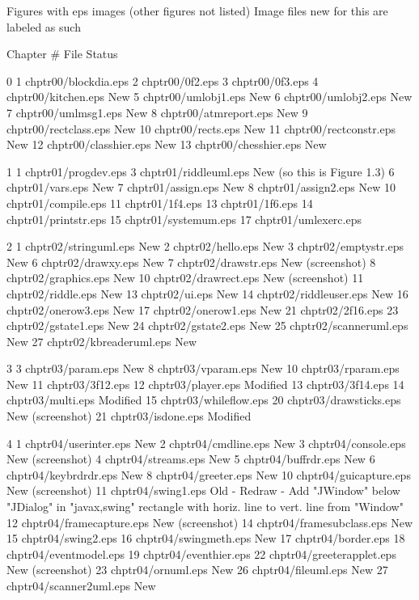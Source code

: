 Figures with eps images (other figures not listed)
Image files new for this are labeled as such

Chapter	#	File				Status

0       1       chptr00/blockdia.eps	       
	2	chptr00/0f2.eps			
	3	chptr00/0f3.eps			
	4	chptr00/kitchen.eps 	New
	5	chptr00/umlobj1.eps	 	New
	6	chptr00/umlobj2.eps		New
	7	chptr00/umlmsg1.eps		New
	8	chptr00/atmreport.eps	New
	9	chptr00/rectclass.eps	New
	10	chptr00/rects.eps		New
	11	chptr00/rectconstr.eps	New
	12	chptr00/classhier.eps	New
	13	chptr00/chesshier.eps	New

1	1	chptr01/progdev.eps		
	3	chptr01/riddleuml.eps	New    (so this is Figure 1.3)
	6	chptr01/vars.eps		New
	7	chptr01/assign.eps		New
	8	chptr01/assign2.eps		New
	10	chptr01/compile.eps
	11	chptr01/1f4.eps
	13	chptr01/1f6.eps
	14	chptr01/printstr.eps
	15	chptr01/systemum.eps
	17	chptr01/umlexerc.eps

2	1	chptr02/stringuml.eps	New
	2	chptr02/hello.eps		New
	3	chptr02/emptystr.eps	New
	6	chptr02/drawxy.eps		New
	7	chptr02/drawstr.eps		New (screenshot)
	8	chptr02/graphics.eps	New
	10	chptr02/drawrect.eps	New (screenshot)
	11	chptr02/riddle.eps		New
	13	chptr02/ui.eps			New
	14	chptr02/riddleuser.eps	New
	16	chptr02/onerow3.eps		New
	17	chptr02/onerow1.eps		New
	21	chptr02/2f16.eps
	23	chptr02/gstate1.eps		New
	24	chptr02/gstate2.eps		New
	25	chptr02/scanneruml.eps	New
	27	chptr02/kbreaderuml.eps	New

3	3	chptr03/param.eps		New
	8	chptr03/vparam.eps		New
	10	chptr03/rparam.eps		New
	11	chptr03/3f12.eps
	12	chptr03/player.eps		Modified
	13	chptr03/3f14.eps		
	14	chptr03/multi.eps		Modified
	15	chptr03/whileflow.eps
	20	chptr03/drawsticks.eps	New (screenshot)
	21	chptr03/isdone.eps		Modified

4	1	chptr04/userinter.eps	New
	2	chptr04/cmdline.eps		New
	3	chptr04/console.eps		New (screenshot)
	4	chptr04/streams.eps		New
	5	chptr04/buffrdr.eps		New
	6	chptr04/keybrdrdr.eps	New
	8	chptr04/greeter.eps		New
	10	chptr04/guicapture.eps	New (screenshot)
	11	chptr04/swing1.eps		Old - Redraw - Add "JWindow" below "JDialog"
	     in "javax,swing" rectangle with horiz. line to vert. line from "Window"
	12	chptr04/framecapture.eps	New (screenshot)
	14	chptr04/framesubclass.eps	New
	15	chptr04/swing2.eps
	16	chptr04/swingmeth.eps	New
	17	chptr04/border.eps
	18	chptr04/eventmodel.eps
	19	chptr04/eventhier.eps
	22	chptr04/greeterapplet.eps	New (screenshot)
	23	chptr04/ornuml.eps		New
	26	chptr04/fileuml.eps		New
	27	chptr04/scanner2uml.eps	New


